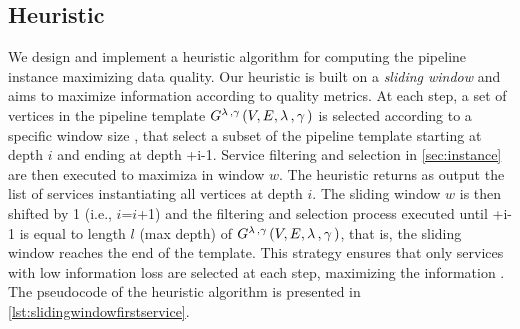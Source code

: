 
\subsection{Heuristic}\label{subsec:heuristics}
We design and implement a heuristic algorithm for computing the pipeline instance maximizing data quality. Our heuristic is built on a \emph{sliding window} and aims to maximize information \quality \emph{\q} according to quality metrics. At each step, a set of vertices in the pipeline template $G^{\lambda\,,\gamma\,}(V,E,\lambda\,,\gamma\,)$ is selected according to a specific window size \windowsize, that select a subset of the pipeline template starting at depth $i$ and ending at depth \windowsize+i-1. Service filtering and selection in \cref{sec:instance} are then executed to maximiza \emph{\quality} in window $w$. The heuristic returns as output the list of services instantiating all vertices at depth $i$. The sliding window $w$ is then shifted by 1 (i.e., $i$=$i$+1) and the filtering and selection process executed until \windowsize+i-1 is equal to length $l$ (max depth) of $G^{\lambda\,,\gamma\,}(V,E,\lambda\,,\gamma\,)$, that is, the sliding window reaches the end of the template.
This strategy ensures that only services with low information loss are selected at each step, maximizing the information \quality \emph{\q}. The pseudocode of the heuristic algorithm is presented in \cref{lst:slidingwindowfirstservice}.

